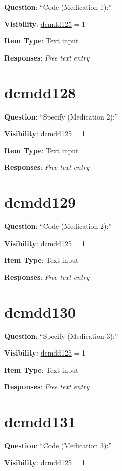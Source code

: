 \documentclass[
]{book}
\begin{document}
\textbf{Question}: ``Code (Medication 1):''

\textbf{Visibility}: \protect\hyperlink{dcmdd125}{dcmdd125} = 1

\textbf{Item Type}: Text input

\textbf{Responses}: \emph{Free text entry}

\hypertarget{dcmdd128}{%
\section{dcmdd128}\label{dcmdd128}}

\textbf{Question}: ``Specify (Medication 2):''

\textbf{Visibility}: \protect\hyperlink{dcmdd125}{dcmdd125} = 1

\textbf{Item Type}: Text input

\textbf{Responses}: \emph{Free text entry}

\hypertarget{dcmdd129}{%
\section{dcmdd129}\label{dcmdd129}}

\textbf{Question}: ``Code (Medication 2):''

\textbf{Visibility}: \protect\hyperlink{dcmdd125}{dcmdd125} = 1

\textbf{Item Type}: Text input

\textbf{Responses}: \emph{Free text entry}

\hypertarget{dcmdd130}{%
\section{dcmdd130}\label{dcmdd130}}

\textbf{Question}: ``Specify (Medication 3):''

\textbf{Visibility}: \protect\hyperlink{dcmdd125}{dcmdd125} = 1

\textbf{Item Type}: Text input

\textbf{Responses}: \emph{Free text entry}

\hypertarget{dcmdd131}{%
\section{dcmdd131}\label{dcmdd131}}

\textbf{Question}: ``Code (Medication 3):''

\textbf{Visibility}: \protect\hyperlink{dcmdd125}{dcmdd125} = 1
\end{document}
